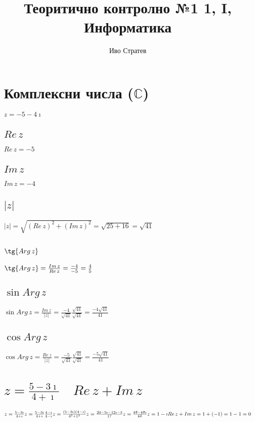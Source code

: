 \documentclass[12pt]{article}
\title{Теоритично контролно №1 1, I, Информатика}
\author{Иво Стратев}
\newcommand{\stkout}[1]{\ifmmode\text{\sout{\ensuremath{#1}}}\else\sout{#1}\fi}
\begin{document}
    \maketitle
    \section{Комплексни числа (\(\mathbb{C}\))}
    \(z = -5 -4\imath\)
    \subsection{\(Re\,z\)}
    \(Re\,z = -5\)
    \subsection{\(Im\,z\)}
    \(Im\,z = -4\)
    \subsection{\(|z|\)}
    \(|z| = \sqrt{(Re\,z)^2 + (Im\,z)^2} = \sqrt{25 + 16} = \sqrt{41}\)
    \subsection{\(\tg{Arg\,z}\)}
    \(\tg{Arg\,z} = \frac{Im\,z}{Re\,z} = \frac{-4}{-5} = \frac{4}{5}\)
    \subsection{\(\sin{Arg\,z}\)}
    \(\sin{Arg\,z} = \frac{Im\,z}{|z|} = \frac{-4}{\sqrt{41}}\frac{\sqrt{41}}{\sqrt{41}} = \frac{-4\sqrt{41}}{41}\)
    \subsection{\(\cos{Arg\,z}\)}
    \(\cos{Arg\,z} = \frac{Re\,z}{|z|} = \frac{-5}{\sqrt{41}}\frac{\sqrt{41}}{\sqrt{41}} = \frac{-5\sqrt{41}}{41}\)
    \section{\(z = \frac{5 - 3\imath}{4 + \imath} \quad Re\,z + Im\,z\)}
    \(z = \frac{5 - 3\imath}{4 + \imath}\\
    \\
    z = \frac{5 - 3\imath}{4 + \imath} \frac{4 - \imath}{4 - \imath}\\
    \\
    z = \frac{(5 - 3\imath)(4 - \imath)}{4^2 + 1^2}\\
    \\
    z = \frac{20 - 5\imath - 12\imath - 3}{17}\\
    \\
    z = \frac{\stkout{17} - \stkout{17}\imath}{\stkout{17}}\\
    \\
    z = 1 - \imath\\
    \\
    Re\,z + Im\,z = 1 + (-1) = 1 - 1 = 0\)
\end{document}
